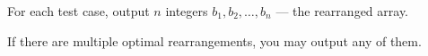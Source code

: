 For each test case, output $n$ integers $b_1, b_2, \dots, b_n$ --- the rearranged array.

If there are multiple optimal rearrangements, you may output any of them.